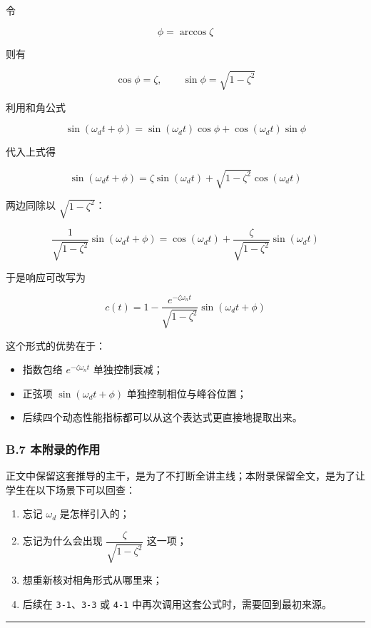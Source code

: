\documentclass[
  11pt]{article}
\providecommand{\tightlist}{%
  \setlength{\itemsep}{0pt}\setlength{\parskip}{0pt}}
\begin{document}
令

\[
\phi=\arccos\zeta
\]

则有

\[
\cos\phi=\zeta,\qquad \sin\phi=\sqrt{1-\zeta^2}
\]

利用和角公式

\[
\sin(\omega_d t+\phi)=\sin(\omega_d t)\cos\phi+\cos(\omega_d t)\sin\phi
\]

代入上式得

\[
\sin(\omega_d t+\phi)
=
\zeta\sin(\omega_d t)+\sqrt{1-\zeta^2}\cos(\omega_d t)
\]

两边同除以 \(\sqrt{1-\zeta^2}\)：

\[
\frac{1}{\sqrt{1-\zeta^2}}\sin(\omega_d t+\phi)
=
\cos(\omega_d t)+\frac{\zeta}{\sqrt{1-\zeta^2}}\sin(\omega_d t)
\]

于是响应可改写为

\[
c(t)=1-\frac{e^{-\zeta\omega_n t}}{\sqrt{1-\zeta^2}}\sin(\omega_d t+\phi)
\]

这个形式的优势在于：

\begin{itemize}
\tightlist
\item
  指数包络 \(e^{-\zeta\omega_n t}\) 单独控制衰减；
\item
  正弦项 \(\sin(\omega_d t+\phi)\) 单独控制相位与峰谷位置；
\item
  后续四个动态性能指标都可以从这个表达式更直接地提取出来。
\end{itemize}

\subsubsection{B.7
本附录的作用}\label{b.7-ux672cux9644ux5f55ux7684ux4f5cux7528}

正文中保留这套推导的主干，是为了不打断全讲主线；本附录保留全文，是为了让学生在以下场景下可以回查：

\begin{enumerate}
\def\labelenumi{\arabic{enumi}.}
\tightlist
\item
  忘记 \(\omega_d\) 是怎样引入的；
\item
  忘记为什么会出现 \(\dfrac{\zeta}{\sqrt{1-\zeta^2}}\) 这一项；
\item
  想重新核对相角形式从哪里来；
\item
  后续在 \texttt{3-1}、\texttt{3-3} 或 \texttt{4-1}
  中再次调用这套公式时，需要回到最初来源。
\end{enumerate}

\begin{center}\rule{0.5\linewidth}{0.5pt}\end{center}
\end{document}
